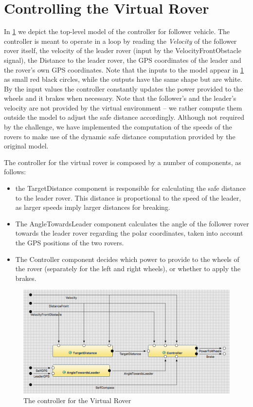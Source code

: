 \section{Controlling the Virtual Rover}
\label{sec:control_vr_model}

In \fig\ref{fig:rover_ctrl} we depict the top-level model of the controller for
follower vehicle. The controller is meant to operate in a loop by reading the
\emph{Velocity} of the follower rover itself, the velocity of the leader rover
(input by the \textsf{VelocityFrontObstacle} signal), the \textsf{Distance} to
the leader rover, the GPS coordinates of the leader and the rover's own GPS
coordinates.
Note that the inputs to the model appear in \fig\ref{fig:rover_ctrl}  as small
red black circles, while the outputs have the same shape but are white. By the
input values the controller constantly updates the power provided to the
wheels and it brakes when necessary. Note that the follower's and the leader's velocity are not
provided by the virtual environment -- we rather compute them outside the model
to adjust the safe distance accordingly. Although not required by the challenge,
we have implemented the computation of the speeds of the rovers to make use of
the dynamic safe distance computation provided by the original \acc model.

The controller for the virtual rover is composed by a number of \af components,
as follows:
\begin{itemize}
  \item the \textsf{TargetDistance} component is responsible for calculating the
  safe distance to the leader rover. This distance is proportional to the speed
  of the leader, as larger speeds imply larger distances for breaking. 
\item The \textsf{AngleTowardsLeader} component calculates the angle of the
follower rover towards the leader rover regarding the polar coordinates, taken
into account the GPS positions of the two rovers.
\item The \textsf{Controller} component decides which power to
provide to the wheels of the rover (separately for the left and right wheels), or whether to
apply the brakes.
\end{itemize}

\begin{figure}[!h]
\centering
\includegraphics[width=1\textwidth]{images/top_level_controller.png}
\caption{The controller for the Virtual Rover}
\label{fig:rover_ctrl}
\end{figure}

